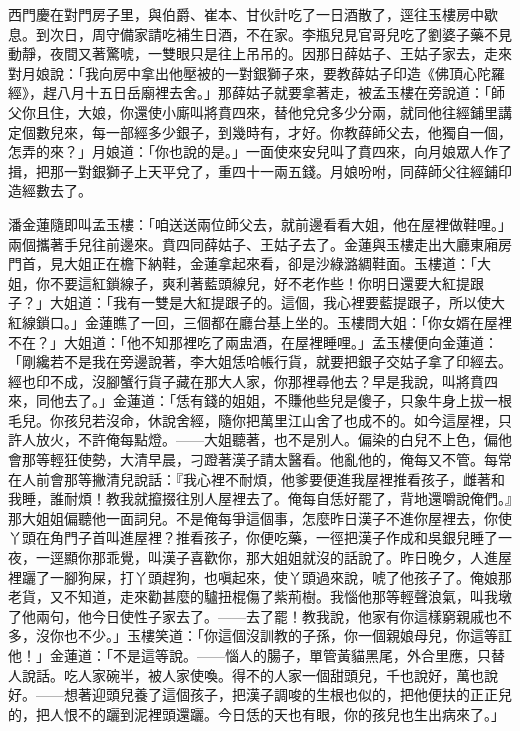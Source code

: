 西門慶在對門房子里，與伯爵、崔本、甘伙計吃了一日酒散了，逕往玉樓房中歇息。到次日，周守備家請吃補生日酒，不在家。李瓶兒見官哥兒吃了劉婆子藥不見動靜，夜間又著驚唬，一雙眼只是往上吊吊的。因那日薛姑子、王姑子家去，走來對月娘說：「我向房中拿出他壓被的一對銀獅子來，要教薛姑子印造《佛頂心陀羅經》，趕八月十五日岳廟裡去舍。」那薛姑子就要拿著走，被孟玉樓在旁說道：「師父你且住，大娘，你還使小廝叫將賁四來，替他兌兌多少分兩，就同他往經鋪里講定個數兒來，每一部經多少銀子，到幾時有，才好。你教薛師父去，他獨自一個，怎弄的來？」月娘道：「你也說的是。」一面使來安兒叫了賁四來，向月娘眾人作了揖，把那一對銀獅子上天平兌了，重四十一兩五錢。月娘吩咐，同薛師父往經鋪印造經數去了。

潘金蓮隨即叫孟玉樓：「咱送送兩位師父去，就前邊看看大姐，他在屋裡做鞋哩。」兩個攜著手兒往前邊來。賁四同薛姑子、王姑子去了。金蓮與玉樓走出大廳東廂房門首，見大姐正在檐下納鞋，金蓮拿起來看，卻是沙綠潞綢鞋面。玉樓道：「大姐，你不要這紅鎖線子，爽利著藍頭線兒，好不老作些！你明日還要大紅提跟子？」大姐道：「我有一雙是大紅提跟子的。這個，我心裡要藍提跟子，所以使大紅線鎖口。」金蓮瞧了一回，三個都在廳台基上坐的。玉樓問大姐：「你女婿在屋裡不在？」大姐道：「他不知那裡吃了兩盅酒，在屋裡睡哩。」孟玉樓便向金蓮道：「剛纔若不是我在旁邊說著，李大姐恁哈帳行貨，就要把銀子交姑子拿了印經去。經也印不成，沒腳蟹行貨子藏在那大人家，你那裡尋他去？早是我說，叫將賁四來，同他去了。」金蓮道：「恁有錢的姐姐，不賺他些兒是傻子，只象牛身上拔一根毛兒。你孩兒若沒命，休說舍經，隨你把萬里江山舍了也成不的。如今這屋裡，只許人放火，不許俺每點燈。——大姐聽著，也不是別人。偏染的白兒不上色，偏他會那等輕狂使勢，大清早晨，刁蹬著漢子請太醫看。他亂他的，俺每又不管。每常在人前會那等撇清兒說話：『我心裡不耐煩，他爹要便進我屋裡推看孩子，雌著和我睡，誰耐煩！教我就攛掇往別人屋裡去了。俺每自恁好罷了，背地還嚼說俺們。』那大姐姐偏聽他一面詞兒。不是俺每爭這個事，怎麼昨日漢子不進你屋裡去，你使丫頭在角門子首叫進屋裡？推看孩子，你便吃藥，一徑把漢子作成和吳銀兒睡了一夜，一逕顯你那乖覺，叫漢子喜歡你，那大姐姐就沒的話說了。昨日晚夕，人進屋裡躧了一腳狗屎，打丫頭趕狗，也嗔起來，使丫頭過來說，唬了他孩子了。俺娘那老貨，又不知道，走來勸甚麼的驢扭棍傷了紫荊樹。我惱他那等輕聲浪氣，叫我墩了他兩句，他今日使性子家去了。——去了罷！教我說，他家有你這樣窮親戚也不多，沒你也不少。」玉樓笑道：「你這個沒訓教的子孫，你一個親娘母兒，你這等訌他！」金蓮道：「不是這等說。——惱人的腸子，單管黃貓黑尾，外合里應，只替人說話。吃人家碗半，被人家使喚。得不的人家一個甜頭兒，千也說好，萬也說好。——想著迎頭兒養了這個孩子，把漢子調唆的生根也似的，把他便扶的正正兒的，把人恨不的躧到泥裡頭還躧。今日恁的天也有眼，你的孩兒也生出病來了。」

